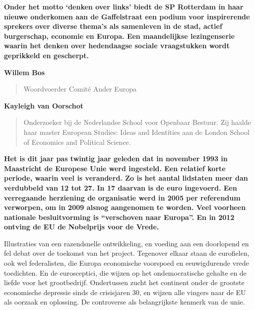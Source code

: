 \documentclass{article}
\begin{document}


\vfill

\textbf{Onder het motto `denken over links' biedt de SP Rotterdam in haar
nieuwe onderkomen aan de Gaffelstraat een podium voor inspirerende sprekers
over diverse thema's als samenleven in de stad, actief burgerschap, economie en
Europa. Een maandelijkse lezingenserie waarin het denken over hedendaagse
sociale vraagstukken wordt geprikkeld en gescherpt.}

\vfill


\vfill

\textbf{\large Willem Bos}
\begin{quote}
  Woordvoerder Comit\'e Ander Europa
\end{quote}

\vfill

\textbf{\large Kayleigh van Oorschot}
\begin{quote}
  Onderzoeker bij de Nederlandse School voor Openbaar Bestuur. Zij haalde haar
  master European Studies: Ideas and Identities aan de London School of
  Economics and Political Science.
\end{quote}

\vfill


\newpage


\vfill

\textbf{Het is dit jaar pas twintig jaar geleden dat in november 1993 in
Maastricht de Europese Unie werd ingesteld. Een relatief korte periode, waarin
veel is veranderd. Zo is het aantal lidstaten meer dan verdubbeld van 12 tot
27. In 17 daarvan is de euro ingevoerd. Een verregaande herziening de
organisatie werd in 2005 per referendum verworpen, om in 2009 alsnog aangenomen
te worden. Veel voorheen nationale besluitvorming is ``verschoven naar
Europa''. En in 2012 ontving de EU de Nobelprijs voor de Vrede.}

\vfill

Illustraties van een razendsnelle ontwikkeling, en voeding aan een doorlopend
en fel debat over de toekomst van het project. Tegenover elkaar staan de
eurofielen, ook wel federalisten, die Europa economische voorspoed en
eeuwigdurende vrede toedichten. En de eurosceptici, die wijzen op het
ondemocratische gehalte en de liefde voor het grootbedrijf. Ondertussen zucht
het continent onder de grootste economische depressie sinds de crisisjaren 30,
en wijzen alle vingers naar de EU als oorzaak en oplossing. De controverse als
belangrijkste kenmerk van de unie.
\end{document}
